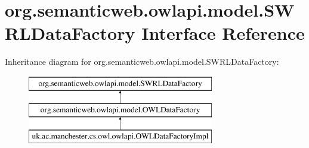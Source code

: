 \hypertarget{interfaceorg_1_1semanticweb_1_1owlapi_1_1model_1_1_s_w_r_l_data_factory}{\section{org.\-semanticweb.\-owlapi.\-model.\-S\-W\-R\-L\-Data\-Factory Interface Reference}
\label{interfaceorg_1_1semanticweb_1_1owlapi_1_1model_1_1_s_w_r_l_data_factory}
}
Inheritance diagram for org.\-semanticweb.\-owlapi.\-model.\-S\-W\-R\-L\-Data\-Factory\-:\begin{figure}[H]
\begin{center}
\leavevmode
\includegraphics[height=3.000000cm]{interfaceorg_1_1semanticweb_1_1owlapi_1_1model_1_1_s_w_r_l_data_factory}
\end{center}
\end{figure}
